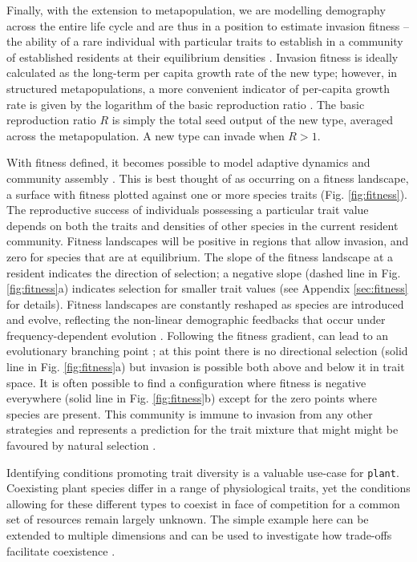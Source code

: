 \documentclass[a4paper,11pt]{article}
\newcommand{\plant}{\texttt{plant}}
\begin{document}
Finally, with the extension to metapopulation, we are modelling demography across
the entire life cycle and are thus in a position to estimate invasion fitness -- 
the ability of a rare
individual with particular traits to establish in a community of
established residents at their equilibrium densities \citep{Metz-1992}.
Invasion fitness
is ideally calculated as the long-term per capita growth rate of the new
type; however, in structured metapopulations, a more convenient
indicator of per-capita growth rate is given by the logarithm of the
basic reproduction ratio \citep{Gyllenberg-2001, Metz-2001}. The basic
reproduction ratio \(R\) is simply the total seed output of the new
type, averaged across the metapopulation. A new type can invade when
\(R > 1\).

With fitness defined, it becomes possible to model adaptive dynamics
and community assembly \citep{Geritz-1998,Dieckmann-2007}. This is best
thought of as occurring on a fitness landscape, a surface with fitness
plotted against one or more species traits (Fig. \ref{fig:fitness}). The
reproductive success of individuals possessing a particular trait value
depends on both the traits and densities of other species in the current
resident community. Fitness landscapes will be positive in regions that allow invasion,
and zero for species that are at equilibrium. The slope of the fitness
landscape at a resident indicates the direction of selection; a
negative slope (dashed line in Fig. \ref{fig:fitness}a) indicates
selection for smaller trait values (see Appendix \ref{sec:fitness} for
details). Fitness landscapes are constantly reshaped as species are
introduced and evolve, reflecting the non-linear demographic feedbacks
that occur under frequency-dependent evolution
\citep{Geritz-1998,Dieckmann-2007}. Following the fitness gradient,
can lead to an evolutionary branching point
\citep{Geritz-1998,Dieckmann-2007}; at this point there is no
directional selection (solid line in Fig. \ref{fig:fitness}a) but
invasion is possible both above and below it in trait space. It is
often possible to find a configuration where fitness is negative
everywhere (solid line in Fig. \ref{fig:fitness}b) except for the zero
points where species are present. This community is immune to invasion
from any other strategies and represents a prediction for the 
trait mixture that might might be favoured by natural selection \citep{Geritz-1998}.

Identifying conditions promoting trait diversity is a valuable use-case
for {\plant}. Coexisting plant species differ in a range of physiological
traits, yet the conditions allowing for these different types to coexist
in face of competition for a common set of resources remain largely
unknown. The simple example here can be extended to multiple dimensions
and can be used to investigate how trade-offs facilitate coexistence
\citep{Falster-2015}.
\end{document}
